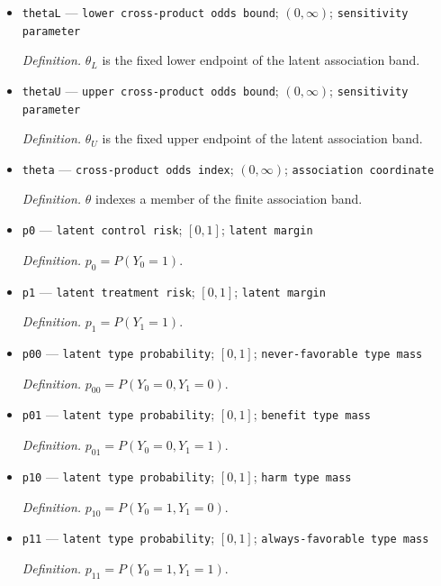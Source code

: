 \documentclass{article}
\begin{document}
\begin{itemize}
  \par\smallskip\noindent\emph{Definition.} \(v_U\) is the upper endpoint of the true-positive rectangle coordinate.
  \item \texttt{thetaL} --- \texttt{lower cross-\allowbreak{}product odds bound}; \((0,\infty)\); \texttt{sensitivity parameter}
  \par\smallskip\noindent\emph{Definition.} \(\theta_L\) is the fixed lower endpoint of the latent association band.
  \item \texttt{thetaU} --- \texttt{upper cross-\allowbreak{}product odds bound}; \((0,\infty)\); \texttt{sensitivity parameter}
  \par\smallskip\noindent\emph{Definition.} \(\theta_U\) is the fixed upper endpoint of the latent association band.
  \item \texttt{theta} --- \texttt{cross-\allowbreak{}product odds index}; \((0,\infty)\); \texttt{association coordinate}
  \par\smallskip\noindent\emph{Definition.} \(\theta\) indexes a member of the finite association band.
  \item \texttt{p0} --- \texttt{latent control risk}; \([0,1]\); \texttt{latent margin}
  \par\smallskip\noindent\emph{Definition.} \(p_0=P(Y_0=1)\).
  \item \texttt{p1} --- \texttt{latent treatment risk}; \([0,1]\); \texttt{latent margin}
  \par\smallskip\noindent\emph{Definition.} \(p_1=P(Y_1=1)\).
  \item \texttt{p00} --- \texttt{latent type probability}; \([0,1]\); \texttt{never-\allowbreak{}favorable type mass}
  \par\smallskip\noindent\emph{Definition.} \(p_{00}=P(Y_0=0,Y_1=0)\).
  \item \texttt{p01} --- \texttt{latent type probability}; \([0,1]\); \texttt{benefit type mass}
  \par\smallskip\noindent\emph{Definition.} \(p_{01}=P(Y_0=0,Y_1=1)\).
  \item \texttt{p10} --- \texttt{latent type probability}; \([0,1]\); \texttt{harm type mass}
  \par\smallskip\noindent\emph{Definition.} \(p_{10}=P(Y_0=1,Y_1=0)\).
  \item \texttt{p11} --- \texttt{latent type probability}; \([0,1]\); \texttt{always-\allowbreak{}favorable type mass}
  \par\smallskip\noindent\emph{Definition.} \(p_{11}=P(Y_0=1,Y_1=1)\).

\end{itemize}
\end{document}
